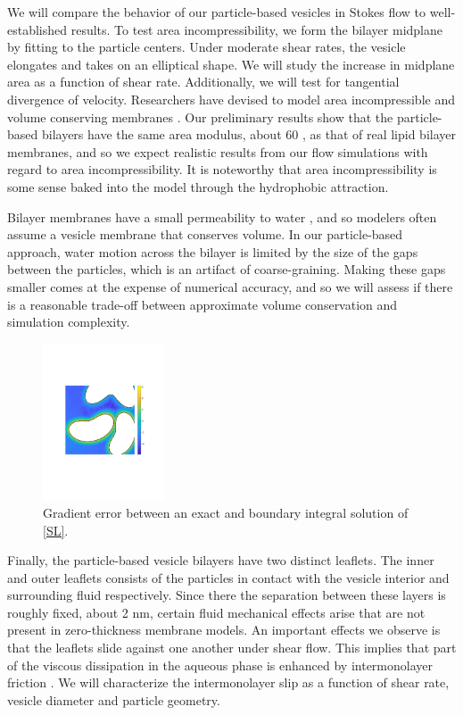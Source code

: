 We will compare the behavior of our particle-based vesicles in Stokes flow to well-established results.
To test area incompressibility, we form the bilayer midplane by fitting to the particle centers. Under moderate shear rates,
the vesicle elongates and takes on an elliptical shape. We will study the increase in midplane area as a function of shear rate.
Additionally, we will test for tangential divergence of velocity.
Researchers have devised to model area incompressible and
volume conserving membranes
\cite{torres-sanchez_millan_arroyo_2019, mahapatra_saintillan_rangamani_2020, Steigmann99, C6SM02452A}.
Our preliminary results show that the particle-based bilayers have the same area modulus, about 60 \kBT,  as that of real lipid bilayer membranes,
and so we expect realistic results from our flow simulations with regard to area incompressibility.  It is noteworthy that
area incompressibility is some sense baked into the model through the hydrophobic attraction. 

Bilayer membranes have a small permeability to water \cite{323e9a2f0c58487ea82518d7a1f96485},
and so modelers often assume a vesicle membrane that conserves volume. In our particle-based approach, water motion across
the bilayer is limited by the size of the gaps between the particles, which is an artifact of coarse-graining.
Making these gaps smaller comes at the expense of numerical accuracy, and so we will assess if there is a reasonable trade-off
between approximate volume conservation and simulation complexity. 

\begin{figure}
\centerline{\includegraphics[width=0.32\textwidth]{figures/BIError.pdf}}
\caption{
\label{fig:bierror}  
  Gradient error between an exact and boundary integral solution of \eqref{SL}.
}
\end{figure}
Finally, the particle-based vesicle bilayers have two distinct leaflets.
The inner and outer leaflets consists of the particles in contact with the vesicle interior and 
surrounding fluid respectively. Since there the separation between these layers is roughly fixed,
about 2 nm, certain fluid mechanical effects arise that are not present in zero-thickness membrane models. 
An important effects we observe is that the leaflets slide against one another under shear flow. 
This implies that part of the viscous dissipation in the aqueous phase is enhanced by intermonolayer friction
\cite{SHKULIPA2005823, ShkulipaThesis}. We will characterize the intermonolayer
slip as a function of shear rate, vesicle diameter and particle geometry. 

